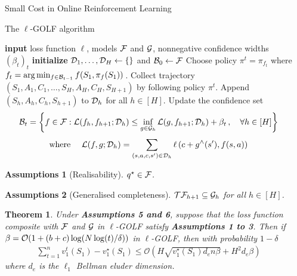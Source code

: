 \documentclass[final,notheorems,noamsthm,20pt]{beamer}
\newtheorem{theorem}{Theorem}
\newtheorem{assumption}{Assumptions}
\newlength{\sepwidth}
\newlength{\colwidth}
\newcommand{\separatorcolumn}{\begin{column}{\sepwidth}\end{column}}
\begin{document}
\begin{frame}[t]
\begin{columns}[t]
\begin{column}{\colwidth}
    \begin{block}{Small Cost in Online Reinforcement Learning}
        \begin{algorithm}[H]
            \caption{The $\ell$-GOLF algorithm}\label{alg:rl}
            \begin{algorithmic}
            \State \textbf{input} loss function $\ell$, models $\mathcal{F}$ and $\mathcal{G}$, nonnegative confidence widths $(\beta_t)_t$ 
            \State \textbf{initialize} $\mathcal{D}_1,\dotsc,\mathcal{D}_H \leftarrow \{\}$ and $\mathcal{B}_0 \leftarrow\mathcal{F}$
            \State Choose policy $\pi^t = \pi_{f_t}$ where $f_t = \arg\min_{f \in \mathcal{B}_{t-1}} f(S_1,\pi_f(S_1))$\,.
            \State Collect trajectory $(S_1,A_1,C_1,\dotsc,S_H, A_H, C_H, S_{H+1})$ by following policy $\pi^t$.
            \State Append $(S_h,A_h,C_h,S_{h+1})$ to $\mathcal{D}_h$ for all $h\in[H]$. 
            \State Update the confidence set 
            \begin{align*}
              \mathcal{B}_t = \left\{f \in \mathcal{F} : \mathcal{L}(f_h,f_{h+1};\mathcal{D}_h) \leq \inf_{g \in \mathcal{G}_h} \mathcal{L}(g,f_{h+1};\mathcal{D}_h) + \beta_t\,, \quad \forall h \in [H]\right\}
            \end{align*}
            \State
            \begin{align*}
              \text{where }\quad \mathcal{L}(f,g;\mathcal{D}_h) = \sum_{(s,a,c,s') \in \mathcal{D}_h} \ell\left(c + g^\wedge(s'),f(s,a)\right)
            \end{align*}
            \EndFor
            \end{algorithmic}
        \end{algorithm}

        \begin{assumption}[Realisability] \label{asp:real}
            $q^\star \in \mathcal{F}$.
        \end{assumption}

        \begin{assumption}[Generalised completeness]\label{asp:complete}
            $\mathcal{T} \mathcal{F}_{h+1} \subseteq \mathcal{G}_h$ for all $h \in [H]$.
          \end{assumption}
        \begin{theorem}
            Under \textbf{Assumptions 5 and 6}, suppose that the loss function composite with $\mathcal{F}$ and $\mathcal{G}$ in $\ell$-GOLF satisfy
            \textbf{Assumptions 1 to 3}.
            Then if $\beta = \mathcal{O}(1 + (b+c)\log(N\log(t)/\delta))$ in $\ell$-GOLF, then with probability $1-\delta$
            \begin{align*}
                \sum_{t=1}^n v^t_1(S_1) - v^\star_1(S_1) \leq  \mathcal{O}\left(H\sqrt{v^\star_1(S_1) d_e n \beta} + H^2 d_e\beta\right)
            \end{align*}
            where $d_e$ is the $\ell_1$ Bellman eluder dimension.
        \end{theorem}
    \end{block}

\end{column}

\separatorcolumn
\end{columns}
\end{frame}
\end{document}
